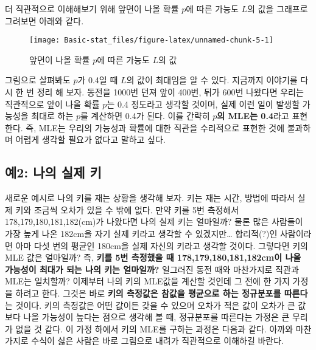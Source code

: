 \documentclass[]{book}
\begin{document}
더 직관적으로 이해해보기 위해 앞면이 나올 확률 \(p\)에 따른 가능도 \(L\)의 값을 그래프로 그려보면 아래와 같다.

\begin{figure}

{\centering \texttt{[image: Basic-stat\_files/figure-latex/unnamed-chunk-5-1]} 

}

\caption{앞면이 나올 확률 $p$에 따른 가능도 $L$의 값}\label{fig:unnamed-chunk-5}
\end{figure}

그림으로 살펴봐도 \(p\)가 0.4일 때 \(L\)의 값이 최대임을 알 수 있다. 지금까지 이야기를 다시 한 번 정리 해 보자. 동전을 1000번 던져 앞이 400번, 뒤가 600번 나왔다면 우리는 직관적으로 앞이 나올 확률 \(p\)는 0.4 정도라고 생각할 것이며, 실제 이런 일이 발생할 가능성을 최대로 하는 \(p\)를 계산하면 0.4가 된다. 이를 간략히 \textbf{\(p\)의 MLE는 0.4}라고 표현한다. 즉, MLE는 우리의 가능성과 확률에 대한 직관을 수리적으로 표현한 것에 불과하며 어렵게 생각할 필요가 없다고 말하고 싶다.

\hypertarget{uxc6082-uxb098uxc758-uxc2e4uxc81c-uxd0a4}{%
\subsection{예2: 나의 실제 키}\label{uxc6082-uxb098uxc758-uxc2e4uxc81c-uxd0a4}}

새로운 예시로 나의 키를 재는 상황을 생각해 보자. 키는 재는 시간, 방법에 따라서 실제 키와 조금씩 오차가 있을 수 밖에 없다. 만약 키를 5번 측정해서 178,179,180,181,182(cm)가 나왔다면 나의 실제 키는 얼마일까? 물론 많은 사람들이 가장 높게 나온 182cm을 자기 실제 키라고 생각할 수 있겠지만\ldots{} 합리적(?)인 사람이라면 아마 다섯 번의 평균인 180cm을 실제 자신의 키라고 생각할 것이다. 그렇다면 키의 MLE 값은 얼마일까? 즉, \textbf{키를 5번 측정했을 때 178,179,180,181,182cm이 나올 가능성이 최대가 되는 나의 키는 얼마일까?} 일그러진 동전 때와 마찬가지로 직관과 MLE는 일치할까? 이제부터 나의 키의 MLE값을 계산할 것인데 그 전에 한 가지 가정을 하려고 한다. 그것은 바로 \textbf{키의 측정값은 참값을 평균으로 하는 정규분포를 따른다}는 것이다. 키의 측정값은 어떤 값이든 갖을 수 있으며 오차가 적은 값이 오차가 큰 값보다 나올 가능성이 높다는 점으로 생각해 볼 때, 정규분포를 따른다는 가정은 큰 무리가 없을 것 같다. 이 가정 하에서 키의 MLE를 구하는 과정은 다음과 같다. 아까와 마찬가지로 수식이 싫은 사람은 바로 그림으로 내려가 직관적으로 이해하길 바란다.
\end{document}
